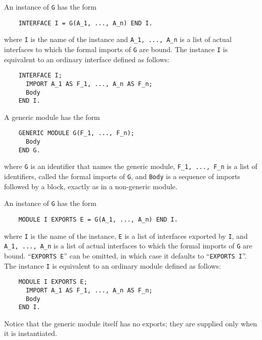 \documentclass[10pt]{article}
\begin{document}
An instance of \verb|G| has the form
\begin{verbatim}
    INTERFACE I = G(A_1, ..., A_n) END I.
\end{verbatim}
where \verb|I| is the name of the instance and \verb|A_1, ..., A_n| is a list
of actual interfaces to which the formal imports of \verb|G| are bound.  The
instance \verb|I| is equivalent to an ordinary interface defined as follows:
\begin{verbatim}
    INTERFACE I;
      IMPORT A_1 AS F_1, ..., A_n AS F_n;
      Body
    END I.
\end{verbatim}

A generic module has the form
\begin{verbatim}
    GENERIC MODULE G(F_1, ..., F_n);
      Body
    END G.
\end{verbatim}
where \verb|G| is an identifier that names the generic module,
\verb|F_1, ..., F_n| is a list of identifiers, called the formal imports of
\verb|G|, and \verb|Body| is a sequence of imports followed by a block,
exactly as in a non-generic module.

An instance of \verb|G| has the form
\begin{verbatim}
    MODULE I EXPORTS E = G(A_1, ..., A_n) END I.
\end{verbatim}
where \verb|I| is the name of the instance, \verb|E| is a list of interfaces
exported by \verb|I|, and \verb|A_1, ..., A_n| is a list of actual interfaces
to which the formal imports of \verb|G| are bound.  ``\verb|EXPORTS E|'' can
be omitted, in which case it defaults to ``\verb|EXPORTS I|''.  The instance
\verb|I| is equivalent to an ordinary module defined as follows:
\begin{verbatim}
    MODULE I EXPORTS E;
      IMPORT A_1 AS F_1, ..., A_n AS F_n;
      Body
    END I.
\end{verbatim}
Notice that the generic module itself has no exports; they are supplied only
when it is instantiated.
\end{document}
